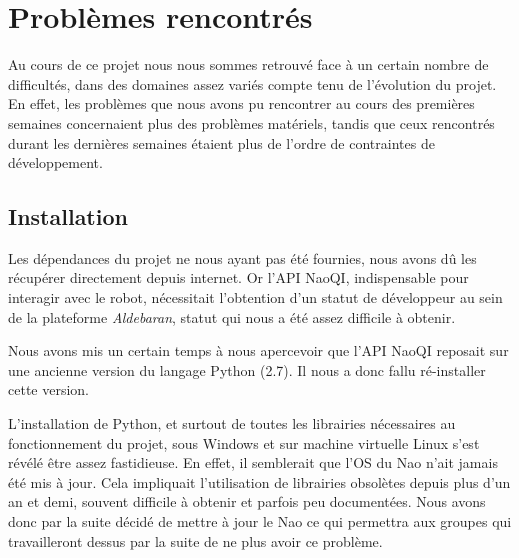 \section{Problèmes rencontrés}
\label{sec:Problèmes rencontrés}

  \par Au cours de ce projet nous nous sommes retrouvé face à un certain nombre de difficultés, dans des domaines assez variés compte tenu de l'évolution du projet.
  En effet, les problèmes que nous avons pu rencontrer au cours des premières semaines concernaient plus des problèmes matériels,
  tandis que ceux rencontrés durant les dernières semaines étaient plus de l'ordre de contraintes de développement.

\subsection{Installation}
\par Les dépendances du projet ne nous ayant pas été fournies, nous avons dû les récupérer directement depuis internet. Or l'API NaoQI, indispensable pour interagir avec le robot, nécessitait l'obtention d'un statut de développeur au sein de la plateforme \textit{Aldebaran}, statut qui nous a été assez difficile à obtenir.
\par Nous avons mis un certain temps à nous apercevoir que l'API NaoQI reposait sur une ancienne version du langage Python (2.7). Il nous a donc fallu ré-installer cette version.
\par L'installation de Python, et surtout de toutes les librairies nécessaires au fonctionnement du projet, sous Windows et sur machine virtuelle Linux s'est révélé être assez fastidieuse. En effet, il semblerait que l'OS du Nao n'ait jamais été mis à jour. Cela impliquait l’utilisation de librairies obsolètes depuis plus d’un an et demi, souvent difficile à obtenir et parfois peu documentées. Nous avons donc par la suite décidé de mettre à jour le Nao ce qui permettra aux groupes qui travailleront dessus par la suite de ne plus avoir ce problème.

